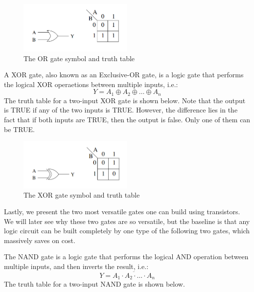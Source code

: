\documentclass{article}
\begin{document}
\begin{figure}[h]
    \centering
    \includegraphics[width = 0.5\textwidth]{images/or.png}
    \caption{The OR gate symbol and truth table}
    \label{fig:enter-label}
\end{figure}

\begin{proposition}
    A XOR gate, also known as an Exclusive-OR gate, is a logic gate that performs the logical XOR operaetions between multiple inputs, i.e.:
    \[ Y = A_1 \oplus A_2 \oplus \ldots \oplus A_n\]
    The truth table for a two-input XOR gate is shown below. Note that the output is TRUE if any of the two inputs is TRUE. However, the difference lies in the fact that if both inputs are TRUE, then the output is false. Only one of them can be TRUE.
\end{proposition}

\begin{figure}[h]
    \centering
    \includegraphics[width = 0.5\textwidth]{images/xor.png}
    \caption{The XOR gate symbol and truth table}
    \label{fig:enter-label}
\end{figure}

Lastly, we present the two most versatile gates one can build using transistors. We will later see why these two gates are so versatile, but the baseline is that any logic circuit can be built completely by one type of the following two gates, which massively saves on cost.

\begin{proposition}
    The NAND gate is a logic gate that performs the logical AND operation between multiple inputs, and then inverts the result, i.e.:
    \[ Y = \overline{A_1 \cdot A_2 \cdot \ldots \cdot A_n} \]
    The truth table for a two-input NAND gate is shown below. 
\end{proposition}
\end{document}
